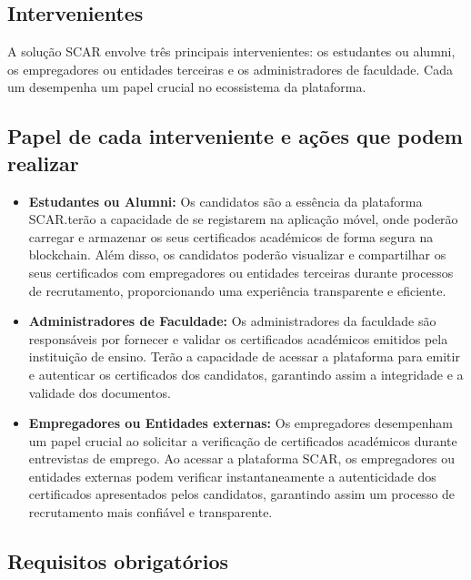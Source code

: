 \documentclass[10pt]{article}
\begin{document}
\subsection*{Intervenientes}

A solução SCAR envolve três principais intervenientes: os estudantes ou alumni, os empregadores ou entidades terceiras e os administradores
de faculdade. Cada um desempenha um papel crucial no ecossistema da plataforma.

\subsection*{Papel de cada interveniente e ações que podem realizar}

\begin{itemize}

    \item \textbf{Estudantes ou Alumni:} Os candidatos são a essência da plataforma SCAR.\@Eles terão a capacidade de se registarem na
          aplicação móvel, onde poderão carregar e armazenar os seus certificados académicos de forma segura na blockchain.
          Além disso, os candidatos poderão visualizar e compartilhar os seus certificados com empregadores ou entidades terceiras durante processos
          de recrutamento, proporcionando uma experiência transparente e eficiente.

    \item \textbf{Administradores de Faculdade:} Os administradores da faculdade são responsáveis por fornecer e validar
          os certificados académicos emitidos pela instituição de ensino. Terão a capacidade de acessar a plataforma
          para emitir e autenticar os certificados dos candidatos, garantindo assim a integridade e a validade dos documentos.

    \item \textbf{Empregadores ou Entidades externas:} Os empregadores desempenham um papel crucial ao solicitar a verificação de certificados
          académicos durante entrevistas de emprego. Ao acessar a plataforma SCAR, os empregadores ou entidades externas podem verificar
          instantaneamente a autenticidade dos certificados apresentados pelos candidatos, garantindo assim um processo
          de recrutamento mais confiável e transparente.

\end{itemize}

\subsection*{Requisitos obrigatórios}
\end{document}
